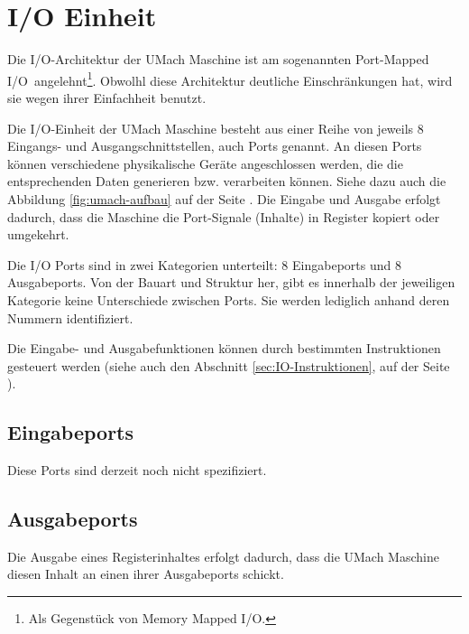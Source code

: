 \section{I/O Einheit}
\label{sec:IO-Einheit}

Die I/O-Architektur der UMach Maschine ist am sogenannten \glqq Port-Mapped
I/O\grqq\ angelehnt\footnote{Als Gegenstück von \glqq Memory Mapped I/O\grqq.}.
Obwolhl diese Architektur deutliche Einschränkungen hat, wird sie wegen ihrer
Einfachheit benutzt.


Die I/O-Einheit der UMach Maschine besteht aus einer Reihe von jeweils 8
Eingangs- und Ausgangschnittstellen, auch Ports
genannt. An diesen Ports können verschiedene physikalische Geräte angeschlossen
werden, die die entsprechenden Daten generieren bzw. verarbeiten können. Siehe
dazu auch die Abbildung \ref{fig:umach-aufbau} auf der Seite
\pageref{fig:umach-aufbau}. Die Eingabe und Ausgabe erfolgt dadurch, dass die
Maschine die Port-Signale (Inhalte) in Register kopiert oder umgekehrt.


Die I/O Ports sind in zwei Kategorien unterteilt: 8 Eingabeports und 8
Ausgabeports. Von der Bauart und Struktur her, gibt es innerhalb der jeweiligen
Kategorie keine Unterschiede zwischen Ports. Sie werden lediglich anhand deren
Nummern identifiziert.


Die Eingabe- und Ausgabefunktionen können durch bestimmten Instruktionen
gesteuert werden (siehe auch den Abschnitt \ref{sec:IO-Instruktionen}, auf der
Seite \pageref{sec:IO-Instruktionen}).



\subsection{Eingabeports}

Diese Ports sind derzeit noch nicht spezifiziert.



\subsection{Ausgabeports}
\label{subsec:Ausgabeports}

Die Ausgabe eines Registerinhaltes erfolgt dadurch, dass die UMach Maschine
diesen Inhalt an einen ihrer Ausgabeports schickt.

